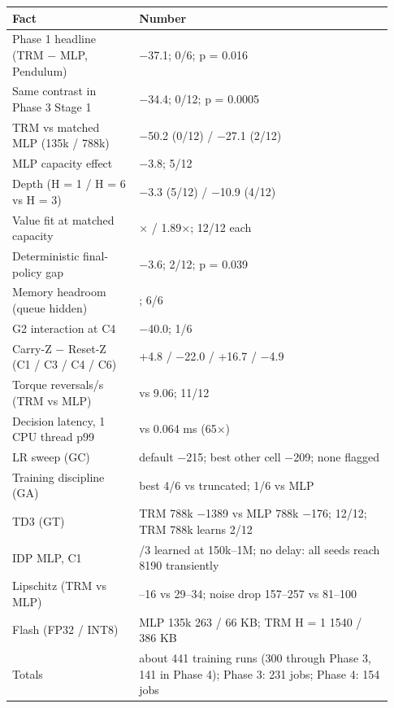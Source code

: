 \documentclass[11pt]{article}
\begin{document}
\begin{center}\small\begin{tabular}{>{\raggedright\arraybackslash}p{0.313\linewidth}>{\raggedright\arraybackslash}p{0.621\linewidth}}
\toprule
Fact & Number \\
\midrule
Phase 1 headline (TRM $-$ MLP, Pendulum) & $-$37.1; 0/6; p = 0.016 \\
Same contrast in Phase 3 Stage 1 & $-$34.4; 0/12; p = 0.0005 \\
TRM vs matched MLP (135k / 788k) & $-$50.2 (0/12) / $-$27.1 (2/12) \\
MLP capacity effect & $-$3.8; 5/12 \\
Depth (H = 1 / H = 6 vs H = 3) & $-$3.3 (5/12) / $-$10.9 (4/12) \\
Value fit at matched capacity & 1.45$\times$ / 1.89$\times$; 12/12 each \\
Deterministic final-policy gap & $-$3.6; 2/12; p = 0.039 \\
Memory headroom (queue hidden) & 70.8; 6/6 \\
G2 interaction at C4 & $-$40.0; 1/6 \\
Carry-Z $-$ Reset-Z (C1 / C3 / C4 / C6) & +4.8 / $-$22.0 / +16.7 / $-$4.9 \\
Torque reversals/s (TRM vs MLP) & 0.38 vs 9.06; 11/12 \\
Decision latency, 1 CPU thread p99 & 4.13 vs 0.064 ms (65$\times$) \\
LR sweep (GC) & default $-$215; best other cell $-$209; none flagged \\
Training discipline (GA) & best 4/6 vs truncated; 1/6 vs MLP \\
TD3 (GT) & TRM 788k $-$1389 vs MLP 788k $-$176; 12/12; TRM 788k learns 2/12 \\
IDP MLP, C1 & 0/3 learned at 150k--1M; no delay: all seeds reach 8190 transiently \\
Lipschitz (TRM vs MLP) & 11--16 vs 29--34; noise drop 157--257 vs 81--100 \\
Flash (FP32 / INT8) & MLP 135k 263 / 66 KB; TRM H = 1 1540 / 386 KB \\
Totals & about 441 training runs (300 through Phase 3, 141 in Phase 4); Phase 3: 231 jobs; Phase 4: 154 jobs \\
\bottomrule
\end{tabular}\end{center}
\end{document}
